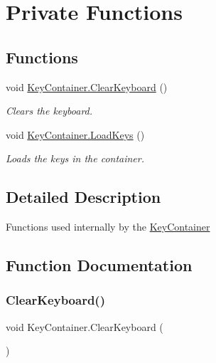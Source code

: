 \hypertarget{group___key_contain_priv_func}{}\section{Private Functions}
\label{group___key_contain_priv_func}
\subsection*{Functions}
\begin{DoxyCompactItemize}
\item 
void \hyperlink{group___key_contain_priv_func_ga679f5ca9d6b1505180e90ee00bbfe616}{Key\+Container.\+Clear\+Keyboard} ()
\begin{DoxyCompactList}\small\item\em Clears the keyboard. \end{DoxyCompactList}\item 
void \hyperlink{group___key_contain_priv_func_ga65f79700f265d2223681ac95981ab4a3}{Key\+Container.\+Load\+Keys} ()
\begin{DoxyCompactList}\small\item\em Loads the keys in the container. \end{DoxyCompactList}\end{DoxyCompactItemize}


\subsection{Detailed Description}
Functions used internally by the \hyperlink{class_key_container}{Key\+Container} 

\subsection{Function Documentation}
\mbox{\label{group___key_contain_priv_func_ga679f5ca9d6b1505180e90ee00bbfe616}} 
\subsubsection{\texorpdfstring{Clear\+Keyboard()}{ClearKeyboard()}}
{\footnotesize\ttfamily void Key\+Container.\+Clear\+Keyboard (\begin{DoxyParamCaption}{ }\end{DoxyParamCaption})\hspace{0.3cm}{\ttfamily [private]}}



